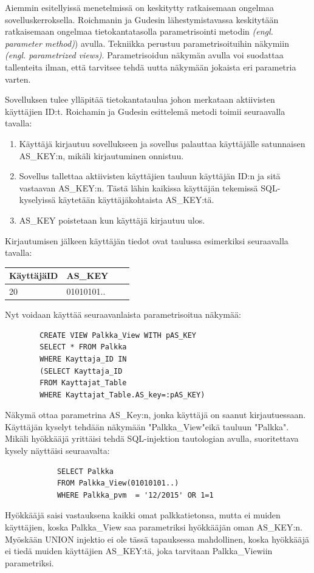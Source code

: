 \documentclass[finnish]{tktltiki2}
\theoremstyle{definition}
\theoremstyle{remark}
\begin{document}
		 
		
		Aiemmin esitellyissä menetelmissä on keskitytty ratkaisemaan ongelmaa sovelluskerroksella. Roichmanin ja Gudesin lähestymistavassa keskitytään ratkaisemaan ongelmaa tietokantatasolla parametrisointi metodin \textit{(engl. parameter method)}) avulla. Tekniikka perustuu parametrisoituihin näkymiin \textit{(engl. parametrized views)}. Parametrisoidun näkymän avulla voi suodattaa tallenteita ilman, että tarvitsee tehdä uutta näkymään jokaista eri parametria varten.
		
		Sovelluksen tulee ylläpitää tietokantataulua johon merkataan aktiivisten käyttäjien ID:t. Roichamin ja Gudesin esittelemä metodi toimii seuraavalla tavalla:
		\begin{enumerate}
			\item Käyttäjä kirjautuu sovellukseen ja sovellus palauttaa käyttäjälle satunnaisen AS\_KEY:n, mikäli kirjautuminen onnistuu.
			
			\item Sovellus tallettaa aktiivisten käyttäjien tauluun käyttäjän ID:n ja sitä vastaavan AS\_KEY:n. Tästä lähin kaikissa käyttäjän tekemissä SQL-kyselyissä käytetään käyttäjäkohtaista AS\_KEY:tä.
			
			\item AS\_KEY poistetaan kun käyttäjä kirjautuu ulos.
		\end{enumerate}
		
		Kirjautumisen jälkeen käyttäjän tiedot ovat taulussa esimerkiksi seuraavalla tavalla:
	
		\begin{center}
		\begin{tabular}{| l | l | l | l |}
			\hline
			KäyttäjäID & AS\_KEY \\ \hline
			\hline
			20 &  01010101.. \\
			\hline
		\end{tabular}
		\end{center}
	

		Nyt voidaan käyttää seuraavanlaista parametrisoitua näkymää:
		\begin{lstlisting}
		CREATE VIEW Palkka_View WITH pAS_KEY
		SELECT * FROM Palkka
		WHERE Kayttaja_ID IN
		(SELECT Kayttaja_ID
		FROM Kayttajat_Table
		WHERE Kayttajat_Table.AS_key=:pAS_KEY) 
		\end{lstlisting}
		Näkymä ottaa parametrina AS\_Key:n, jonka käyttäjä on saanut kirjautuessaan. Käyttäjän kyselyt tehdään näkymään "Palkka\_View"\space eikä tauluun "Palkka". Mikäli hyökkääjä yrittäisi tehdä SQL-injektion tautologian avulla, suoritettava kysely näyttäisi seuraavalta:
		\begin{lstlisting}
			SELECT Palkka
			FROM Palkka_View(01010101..) 
			WHERE Palkka_pvm  = '12/2015' OR 1=1
		\end{lstlisting}
		Hyökkääjä saisi vastauksena kaikki omat palkkatietonsa, mutta ei muiden käyttäjien, koska Palkka\_View saa parametriksi hyökkääjän oman AS\_KEY:n. Myöskään UNION injektio ei ole tässä tapauksessa mahdollinen, koska hyökkääjä ei tiedä muiden käyttäjien AS\_KEY:tä, joka tarvitaan Palkka\_Viewiin parametriksi.
	
\end{document}
